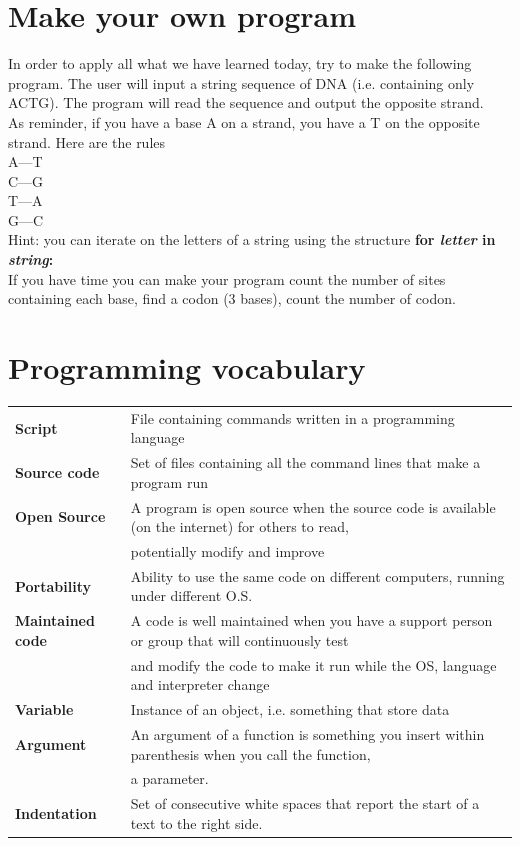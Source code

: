 \documentclass[article,10pt]{scrartcl}
\begin{document}
\section*{Make your own program}
In order to apply all what we have learned today, try to make the following program. The user will input a string sequence of DNA (i.e. containing only ACTG). The program will read the sequence and output the opposite strand. \\
As reminder, if you have a base A on a strand, you have a T on the opposite strand. Here are the rules\\
A---T\\
C---G\\
T---A\\
G---C\\

Hint: you can iterate on the letters of a string using the structure \textbf{for \textit{letter} in \textit{string}:}\\


If you have time you can make your program count the number of sites containing each base, find a codon (3 bases), count the number of codon. 
\section*{Programming vocabulary}
\begin{tabular}{ll}
\textbf{Script}& File containing commands written in a programming language\\
\textbf{Source code} & Set of files containing all the command lines that make a program run\\
\textbf{Open Source} & A program is open source when the source code is available (on the internet) for others to read, \\
& potentially modify and improve \\
\textbf{Portability} & Ability to use the same code on different computers, running under different O.S.\\
\textbf{Maintained code} & A code is well maintained when you have a support person or group that will continuously test\\
& and modify the code to make it run while the OS, language and interpreter change\\
\textbf{Variable} & Instance of an object, i.e. something that store data\\
\textbf{Argument} & An argument of a function is something you insert within parenthesis when you call the function,\\
& a parameter.\\
\textbf{Indentation} & Set of consecutive white spaces that report the start of a text to the right side.\\
\end{tabular}
\newpage
\end{document}
